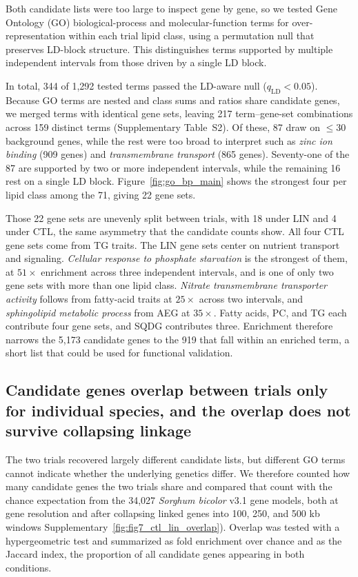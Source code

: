 \documentclass[9pt,twocolumn,twoside]{rilabRxiv}
\begin{document}
Both candidate lists were too large to inspect gene by gene, so we tested Gene Ontology (GO) biological-process and molecular-function terms for over-representation within each trial lipid class, using a permutation null that preserves LD-block structure. This distinguishes terms supported by multiple independent intervals from those driven by a single LD block.

In total, 344 of 1{,}292 tested terms passed the LD-aware null ($q_{\mathrm{LD}}<0.05$). Because GO terms are nested and class sums and ratios share candidate genes, we merged terms with identical gene sets, leaving 217 term--gene-set combinations across 159 distinct terms (Supplementary Table~S2). Of these, 87 draw on $\leq 30$ background genes, while the rest were too broad to interpret such as \textit{zinc ion binding} (909 genes) and \textit{transmembrane transport} (865 genes). Seventy-one of the 87 are supported by two or more independent intervals, while the remaining 16 rest on a single LD block. Figure~\ref{fig:go_bp_main} shows the strongest four per lipid class among the 71, giving 22 gene sets.

Those 22 gene sets are unevenly split between trials, with 18 under LIN and 4 under CTL, the same asymmetry that the candidate counts show. All four CTL gene sets come from TG traits. The LIN gene sets center on nutrient transport and signaling. \textit{Cellular response to phosphate starvation} is the strongest of them, at $51\times$ enrichment across three independent intervals, and is one of only two gene sets with more than one lipid class. \textit{Nitrate transmembrane transporter activity} follows from fatty-acid traits at $25\times$ across two intervals, and \textit{sphingolipid metabolic process} from AEG at $35\times$. Fatty acids, PC, and TG each contribute four gene sets, and SQDG contributes three. Enrichment therefore narrows the 5,173 candidate genes to the 919 that fall within an enriched term, a short list that could be used for functional validation.

\subsection*{Candidate genes overlap between trials only for individual species, and the overlap does not survive collapsing linkage}

The two trials recovered largely different candidate lists, but different GO terms cannot indicate whether the underlying genetics differ. We therefore counted how many candidate genes the two trials share and compared that count with the chance expectation from the 34{,}027 \textit{Sorghum bicolor} v3.1 gene models, both at gene resolution and after collapsing linked genes into 100, 250, and 500 kb windows Supplementary~\ref{fig:fig7_ctl_lin_overlap}). Overlap was tested with a hypergeometric test and summarized as fold enrichment over chance and as the Jaccard index, the proportion of all candidate genes appearing in both conditions.
\end{document}
